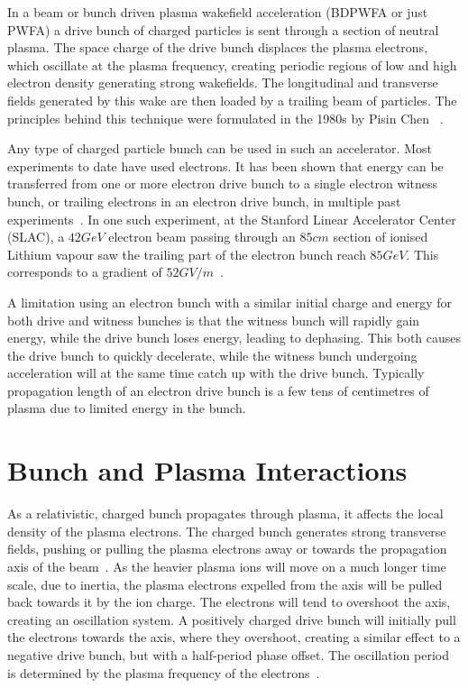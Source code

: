 In a beam or bunch driven plasma wakefield acceleration (BDPWFA or just PWFA) a drive bunch of charged particles is sent through a section of neutral plasma.
The space charge of the drive bunch displaces the plasma electrons, which oscillate at the plasma frequency, creating periodic regions of low and high electron density generating strong wakefields.
The longitudinal and transverse fields generated by this wake are then loaded by a trailing beam of particles.
The principles behind this technique were formulated in the 1980s by Pisin Chen \etal~\cite{chen:1985}.

Any type of charged particle bunch can be used in such an accelerator.
Most experiments to date have used electrons.
It has been shown that energy can be transferred from one or more electron drive bunch to a single electron witness bunch, or trailing electrons in an electron drive bunch, in multiple past experiments~\cite{rosenzweig:1988, blumenfeld:2007, kallos:2007, litos:2014, nakajima:1990}.
In one such experiment, at the Stanford Linear Accelerator Center (SLAC), a $42\unit{GeV}$ electron beam passing through an $85\unit{cm}$ section of ionised Lithium vapour saw the trailing part of the electron bunch reach $85\unit{GeV}$.
This corresponds to a gradient of $52\unit{GV/m}$~\cite{blumenfeld:2007}.

A limitation using an electron bunch with a similar initial charge and energy for both drive and witness bunches is that the witness bunch will rapidly gain energy, while the drive bunch loses energy, leading to dephasing.
This both causes the drive bunch to quickly decelerate, while the witness bunch undergoing acceleration will at the same time catch up with the drive bunch.
Typically propagation length of an electron drive bunch is a few tens of centimetres of plasma due to limited energy in the bunch.

\section{Bunch and Plasma Interactions}
\label{Int:BPI}

As a relativistic, charged bunch propagates through plasma, it affects the local density of the plasma electrons.
The charged bunch generates strong transverse fields, pushing or pulling the plasma electrons away or towards the propagation axis of the beam~\cite{lee:2001,adli:2016b}.
As the heavier plasma ions will move on a much longer time scale, due to inertia, the plasma electrons expelled from the axis will be pulled back towards it by the ion charge.
The electrons will tend to overshoot the axis, creating an oscillation system.
A positively charged drive bunch will initially pull the electrons towards the axis, where they overshoot, creating a similar effect to a negative drive bunch, but with a half-period phase offset.
The oscillation period is determined by the plasma frequency of the electrons~\cite{hogan:2016,muggli:2017}. 

